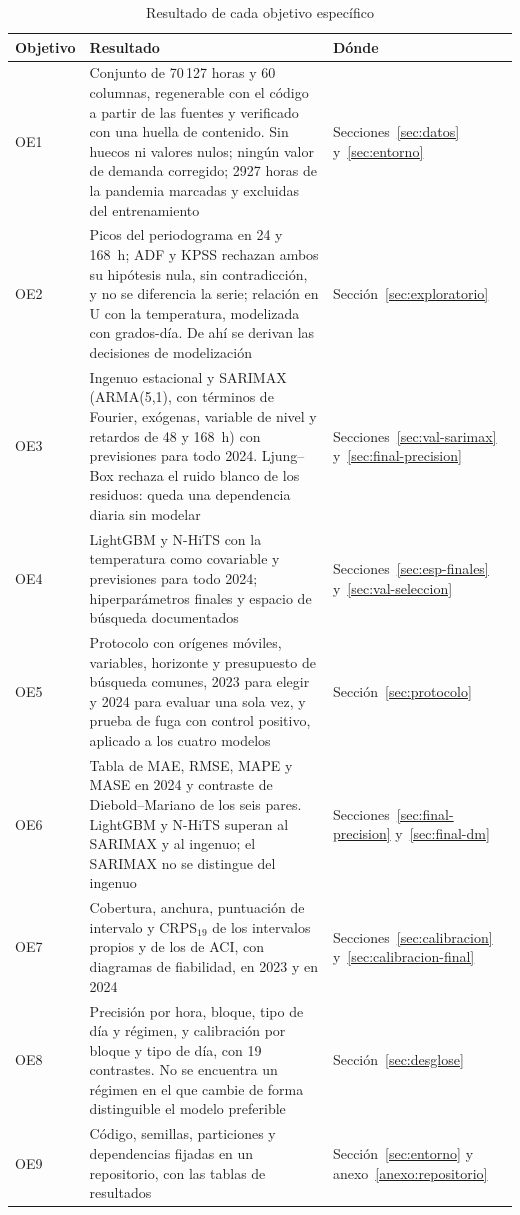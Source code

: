 \begin{table}[H]
	\centering
	\caption{Resultado de cada objetivo específico}
	\label{tab:concl-objetivos}
	\small
	\begin{tabularx}{\textwidth}{l >{\raggedright\arraybackslash}X >{\raggedright\arraybackslash}p{3.0cm}}
		\hline
		\textbf{Objetivo} & \textbf{Resultado} & \textbf{Dónde} \\
		\hline
		OE1 & Conjunto de 70\,127 horas y 60 columnas, regenerable con el código a partir de las fuentes y verificado con una huella de contenido. Sin huecos ni valores nulos; ningún valor de demanda corregido; 2927 horas de la pandemia marcadas y excluidas del entrenamiento & Secciones~\ref{sec:datos} y~\ref{sec:entorno} \\
		OE2 & Picos del periodograma en 24 y 168~h; ADF y KPSS rechazan ambos su hipótesis nula, sin contradicción, y no se diferencia la serie; relación en U con la temperatura, modelizada con grados-día. De ahí se derivan las decisiones de modelización & Sección~\ref{sec:exploratorio} \\
		OE3 & Ingenuo estacional y SARIMAX (ARMA(5,1), con términos de Fourier, exógenas, variable de nivel y retardos de 48 y 168~h) con previsiones para todo 2024. Ljung--Box rechaza el ruido blanco de los residuos: queda una dependencia diaria sin modelar & Secciones~\ref{sec:val-sarimax} y~\ref{sec:final-precision} \\
		OE4 & LightGBM y N-HiTS con la temperatura como covariable y previsiones para todo 2024; hiperparámetros finales y espacio de búsqueda documentados & Secciones~\ref{sec:esp-finales} y~\ref{sec:val-seleccion} \\
		OE5 & Protocolo con orígenes móviles, variables, horizonte y presupuesto de búsqueda comunes, 2023 para elegir y 2024 para evaluar una sola vez, y prueba de fuga con control positivo, aplicado a los cuatro modelos & Sección~\ref{sec:protocolo} \\
		OE6 & Tabla de MAE, RMSE, MAPE y MASE en 2024 y contraste de Diebold--Mariano de los seis pares. LightGBM y N-HiTS superan al SARIMAX y al ingenuo; el SARIMAX no se distingue del ingenuo & Secciones~\ref{sec:final-precision} y~\ref{sec:final-dm} \\
		OE7 & Cobertura, anchura, puntuación de intervalo y CRPS$_{19}$ de los intervalos propios y de los de ACI, con diagramas de fiabilidad, en 2023 y en 2024 & Secciones~\ref{sec:calibracion} y~\ref{sec:calibracion-final} \\
		OE8 & Precisión por hora, bloque, tipo de día y régimen, y calibración por bloque y tipo de día, con 19 contrastes. No se encuentra un régimen en el que cambie de forma distinguible el modelo preferible & Sección~\ref{sec:desglose} \\
		OE9 & Código, semillas, particiones y dependencias fijadas en un repositorio, con las tablas de resultados & Sección~\ref{sec:entorno} y anexo~\ref{anexo:repositorio} \\
		\hline
	\end{tabularx}
\end{table}

